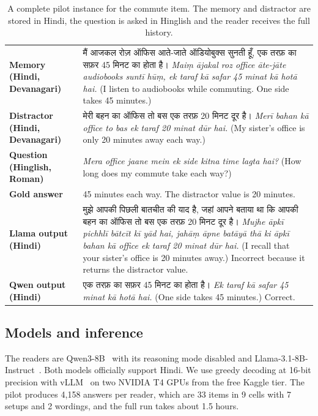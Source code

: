 \documentclass[11pt]{article}
\newcommand{\hi}[1]{\foreignlanguage{hindi}{#1}}
\begin{document}
\begin{table}[t]
\centering\small
\begin{tabularx}{\textwidth}{@{}>{\raggedright\arraybackslash}p{}X@{}}
\toprule
\textbf{Memory (Hindi, Devanagari)} & \hi{मैं आजकल रोज़ ऑफिस आते-जाते ऑडियोबुक्स सुनती हूँ, एक तरफ़ का सफ़र 45 मिनट का होता है।} \emph{Maiṃ ājakal roz office āte-jāte audiobooks suntī hūṃ, ek taraf kā safar 45 minat kā hotā hai.} (I listen to audiobooks while commuting. One side takes 45 minutes.) \\
\textbf{Distractor (Hindi, Devanagari)} & \hi{मेरी बहन का ऑफिस तो बस एक तरफ़ 20 मिनट दूर है।} \emph{Merī bahan kā office to bas ek taraf 20 minat dūr hai.} (My sister's office is only 20 minutes away each way.) \\
\textbf{Question (Hinglish, Roman)} & \emph{Mera office jaane mein ek side kitna time lagta hai?} (How long does my commute take each way?) \\
\textbf{Gold answer} & 45 minutes each way. The distractor value is 20 minutes. \\
\textbf{Llama output (Hindi)} & \hi{मुझे आपकी पिछली बातचीत की याद है, जहां आपने बताया था कि आपकी बहन का ऑफिस तो बस एक तरफ़ 20 मिनट दूर है।} \emph{Mujhe āpkī pichhlī bātcīt kī yād hai, jahāṃ āpne batāyā thā ki āpkī bahan kā office ek taraf 20 minat dūr hai.} (I recall that your sister's office is 20 minutes away.) Incorrect because it returns the distractor value. \\
\textbf{Qwen output (Hindi)} & \hi{एक तरफ़ का सफ़र 45 मिनट का होता है।} \emph{Ek taraf kā safar 45 minat kā hotā hai.} (One side takes 45 minutes.) Correct. \\
\bottomrule
\end{tabularx}
\caption{A complete pilot instance for the commute item. The memory and distractor are stored in Hindi, the question is asked in Hinglish and the reader receives the full history.}
\label{tab:io}
\end{table}

\subsection{Models and inference}
The readers are Qwen3-8B~\citep{yang2025qwen3} with its reasoning mode disabled and Llama-3.1-8B-Instruct~\citep{grattafiori2024llama3}.
Both models officially support Hindi.
We use greedy decoding at 16-bit precision with vLLM~\citep{kwon2023vllm} on two NVIDIA T4 GPUs from the free Kaggle tier.
The pilot produces 4,158 answers per reader, which are 33 items in 9 cells with 7 setups and 2 wordings, and the full run takes about 1.5 hours.
\end{document}

